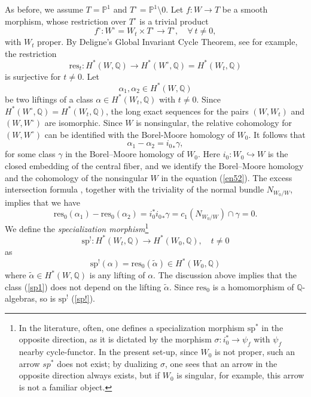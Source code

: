 \documentclass[11pt]{amsart}
\theoremstyle{plain}
\theoremstyle{definition}
\theoremstyle{remark}
\newcommand{\BP}{{\mathbb{P}}}
\newcommand{\BQ}{{\mathbb{Q}}}
\begin{document}
As before, we assume $T = \BP^1$ and $T^\circ = \BP^1 \setminus 0$. Let $f: W \to T$ be a smooth morphism, whose restriction over $T^\circ$ is a trivial product
\[
f^\circ: W^\circ = W_t \times T^\circ \rightarrow T^\circ, \quad \forall~ t\neq 0,
\]
with $W_t$ proper.
By Deligne's Global Invariant Cycle Theorem, see  \cite[Theorem 1.7.1]{dCM1} for example, the restriction 
\[
\mathrm{res}_t:  H^*(W, \BQ) \to  H^*(W^\circ,\BQ)=H^*(W_t, \BQ)
\]
is surjective for $t \neq 0$. Let 
\[
\alpha_1, \alpha_2 \in H^*(W, \BQ)
\]
be two liftings of a class $\alpha \in H^*(W_t, \BQ)$ with $t\neq 0$. Since $H^*(W^\circ,\BQ)=H^*(W_t,\BQ)$, the long exact sequences for the pairs $(W,W_t)$ and $(W, W^\circ)$
are isomorphic. Since $W$ is nonsingular, the relative cohomology for $(W,W^\circ)$ can be identified with the Borel-Moore homology of $W_0$. It follows that
\begin{equation}\label{en52}
\alpha_1 - \alpha_2 = {i_0}_* \gamma, 
\end{equation}
for some class $\gamma$
 in the Borel--Moore homology of $W_0$.  Here $i_0: W_0 \hookrightarrow W$ is the closed embedding of the central fiber, and we identify the Borel--Moore homology and the cohomology of the nonsingular $W$ in the equation (\ref{en52}). The excess intersection formula \cite[Corollary 6.3]{Fulton}, {together with the triviality of the normal bundle $N_{W_0/W}$,} implies that we have
 \[
\mathrm{res}_0(\alpha_1) - \mathrm{res}_0(\alpha_2) = i_0^*{i_0}_* \gamma = c_1(N_{W_0/W})\cap \gamma =0.
\]
We define the \emph{specialization morphism}\footnote{In the literature, often, one defines a specialization morphism  $\mathrm{sp}^*$ in the opposite direction, as it is dictated by the morphism $\sigma: i_0^* \to \psi_f$ with $\psi_f$ nearby cycle-functor. In the present set-up, since $W_0$ is not proper, such an arrow $sp^*$ does not exist; 
by dualizing $\sigma$, one sees that an arrow in the opposite direction always exists, but if $W_0$ is singular, for example, this arrow is not a familiar object.}
\begin{equation}\label{sp!}
\mathrm{sp}^!: H^*(W_t, \BQ) \rightarrow H^*(W_0, \BQ), \quad t\neq 0
\end{equation}
as
\begin{equation}\label{sp1}
\mathrm{sp^!}(\alpha) = \mathrm{res}_0(\tilde{\alpha}) \in H^*(W_0, \BQ)
\end{equation}
where $\tilde{\alpha} \in H^*(W, \BQ)$ is any lifting of $\alpha$. The discussion above implies that the class (\ref{sp1}) does not depend on the lifting $\tilde{\alpha}$. Since $\mathrm{res}_0$ is a homomorphism of $\BQ$-algebras, so is $\mathrm{sp}^!$  (\ref{sp!}).
\end{document}
